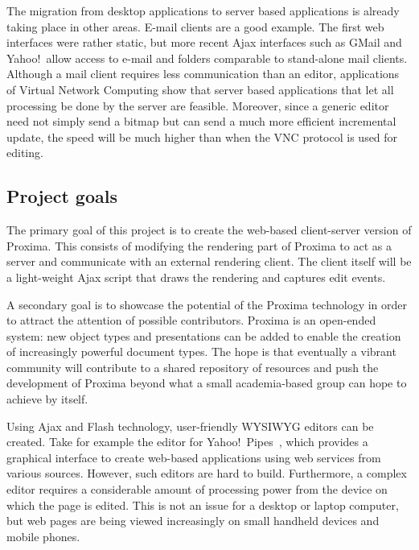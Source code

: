 \documentclass[10pt]{article}
\begin{document}

The migration from desktop applications to server based applications is already taking place in other areas. E-mail clients are a good example. The first web interfaces were rather static, but more recent Ajax interfaces such as GMail and Yahoo!\ allow access to e-mail and folders comparable to stand-alone mail clients. Although a mail client requires less communication than an editor, applications of Virtual Network Computing show that server based applications that let all processing be done by the server are feasible. Moreover, since a generic editor need not simply send a bitmap but can send a much more efficient incremental update, the speed will be much higher than when the VNC protocol is used for editing. 

\subsection{Project goals}

The primary goal of this project is to create the web-based client-server version of Proxima. This consists of modifying the rendering part of Proxima to act as a server and communicate with an external rendering client. The client itself will be a light-weight Ajax script that draws the rendering and captures edit events.  

A secondary goal is to showcase the potential of the Proxima technology in order to attract the attention of possible contributors. Proxima is an open-ended system: new object types and presentations can be added to enable the creation of increasingly powerful document types. The hope is that eventually a vibrant community will contribute to a shared repository of resources and push the development of Proxima beyond what a small academia-based group can hope to achieve by itself. 


\bc

Using Ajax and Flash technology, user-friendly WYSIWYG editors can be created. Take for example the editor for Yahoo!\ Pipes~\cite{yahoo08pipes}, which provides a graphical interface to create web-based applications using web services from various sources. However, such editors are hard to build. Furthermore, a complex editor requires a considerable amount of processing power from the device on which the page is edited. This is not an issue for a desktop or laptop computer, but web pages are being viewed increasingly on small handheld devices and mobile phones. 
\end{document}
